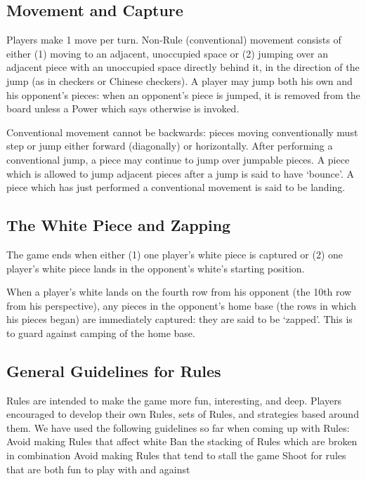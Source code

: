\documentclass[../rulebook.tex]{subfiles}
\begin{document}
\subsection*{Movement and Capture}
Players make 1 move per turn.
Non-Rule (conventional) movement consists of either
(1) moving to an adjacent, unoccupied space or
(2) jumping over an adjacent piece with an unoccupied
space directly behind it, in the direction of the jump
(as in checkers or Chinese checkers).
A player may jump both his own and his opponent's pieces:
when an opponent's piece is jumped, it is removed from the board
unless a Power which says otherwise is invoked.

Conventional movement cannot be backwards:
pieces moving conventionally must step or jump either forward
(diagonally) or horizontally.
After performing a conventional jump,
a piece may continue to jump over jumpable pieces.
A piece which is allowed to jump adjacent pieces after a jump
is said to have `bounce'.
A piece which has just performed a conventional movement
is said to be landing.

\subsection*{The White Piece and Zapping}
The game ends when either (1) one player's white piece is captured or
(2) one player's white piece lands in the opponent's
white's starting position.

When a player's white lands on the fourth row from his opponent
(the 10th row from his perspective),
any pieces in the opponent's home base
(the rows in which his pieces began) are immediately captured:
they are said to be `zapped'.
This is to guard against camping of the home base.

\subsection*{General Guidelines for Rules}
Rules are intended to make the game more fun, interesting, and deep.
Players encouraged to develop their own Rules, sets of Rules,
and strategies based around them.
We have used the following guidelines so far when coming up with Rules:
 Avoid making Rules that affect white
 Ban the stacking of Rules which are broken in combination
 Avoid making Rules that tend to stall the game
 Shoot for rules that are both fun to play with and against
\end{document}
